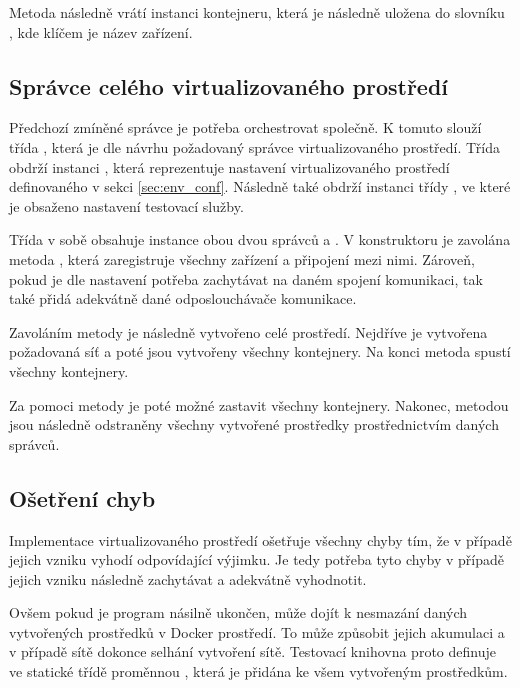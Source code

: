 Metoda  následně vrátí instanci kontejneru, která je následně uložena do slovníku , kde klíčem je název zařízení. 

\subsection{Správce celého virtualizovaného prostředí}

Předchozí zmíněné správce je potřeba orchestrovat společně. K tomuto slouží třída , která je dle návrhu požadovaný správce virtualizovaného prostředí. Třída obdrží instanci , která reprezentuje nastavení virtualizovaného prostředí definovaného v sekci \ref{sec:env_conf}. Následně také obdrží instanci třídy , ve které je obsaženo nastavení testovací služby.

Třída v sobě obsahuje instance obou dvou správců  a . V konstruktoru je zavolána metoda , která zaregistruje všechny zařízení a připojení mezi nimi. Zároveň, pokud je dle nastavení potřeba zachytávat na daném spojení komunikaci, tak také přidá adekvátně dané odposlouchávače komunikace. 

Zavoláním metody  je následně vytvořeno celé prostředí. Nejdříve je vytvořena požadovaná síť a poté jsou vytvořeny všechny kontejnery. Na konci metoda spustí všechny kontejnery.

Za pomoci metody  je poté možné zastavit všechny kontejnery. Nakonec, metodou  jsou následně odstraněny všechny vytvořené prostředky prostřednictvím daných správců. 

\subsection{Ošetření chyb}

Implementace virtualizovaného prostředí ošetřuje všechny chyby tím, že v případě jejich vzniku vyhodí odpovídající výjimku. Je tedy potřeba tyto chyby v případě jejich vzniku následně zachytávat a adekvátně vyhodnotit.

Ovšem pokud je program násilně ukončen, může dojít k nesmazání daných vytvořených prostředků v Docker prostředí. To může způsobit jejich akumulaci a v případě sítě dokonce selhání vytvoření sítě. Testovací knihovna proto definuje ve statické třídě  proměnnou , která je přidána ke všem vytvořeným prostředkům.

